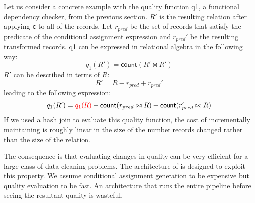Let us consider a concrete example with the quality function q1, a functional dependency checker, from the previous section.
$R'$ is the resulting relation after applying \texttt{c} to all of the records.
Let $r_{pred}$ be the set of records that satisfy the predicate of the conditional assignment expression and $r_{pred}'$ be the resulting transformed records.
q1 can be expressed in relational algebra in the following way:
\[
q_1(R') = \textsf{count}( R' \bowtie R' )
\]
$R'$ can be described in terms of $R$:
\[
R' = R - r_{pred} + r_{pred}' 
\]
leading to the following expression:
\[
q_1(R') = \textcolor{red}{q_1(R)} - \textsf{count}( r_{pred} \bowtie R )  + \textsf{count}( r'_{pred} \bowtie R )
\]
If we used a hash join to evaluate this quality function, the cost of incrementally maintaining is roughly linear in the size of the number records changed rather than the size of the relation.

The consequence is that evaluating changes in quality can be very efficient for a large class of data cleaning problems.
The architecture of \sys is designed to exploit this property.
We assume conditional assignment generation to be expensive but quality evaluation to be fast.
An architecture that runs the entire pipeline before seeing the resultant quality is wasteful.




